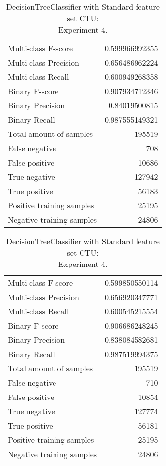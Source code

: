 \begin{table}[H]
\begin{minipage}{0.5\textwidth}
\caption{DecisionTreeClassifier with Standard feature set CTU: \\Experiment 3.}
\centering
\begin{tabular}{l r}
\toprule
Multi-class F-score & 0.599966992355 \\
Multi-class Precision & 0.656486962224 \\
Multi-class Recall & 0.600949268358 \\
\midrule
Binary F-score & 0.907934712346 \\
Binary Precision & 0.84019500815 \\
Binary Recall & 0.987555149321 \\
\midrule
Total amount of samples & 195519 \\
False negative & 708 \\
False positive & 10686 \\
True negative & 127942 \\
True positive & 56183 \\
\midrule
Positive training samples & 25195 \\
Negative training samples & 24806 \\
\bottomrule
\end{tabular}
\end{minipage}
\hfillx
\begin{minipage}{0.5\textwidth}
\caption{DecisionTreeClassifier with Standard feature set CTU: \\Experiment 4.}
\centering
\begin{tabular}{l r}
\toprule
Multi-class F-score & 0.599850550114 \\
Multi-class Precision & 0.656920347771 \\
Multi-class Recall & 0.600545215554 \\
\midrule
Binary F-score & 0.906686248245 \\
Binary Precision & 0.838084582681 \\
Binary Recall & 0.987519994375 \\
\midrule
Total amount of samples & 195519 \\
False negative & 710 \\
False positive & 10854 \\
True negative & 127774 \\
True positive & 56181 \\
\midrule
Positive training samples & 25195 \\
Negative training samples & 24806 \\
\bottomrule
\end{tabular}
\end{minipage}
\end{table}





